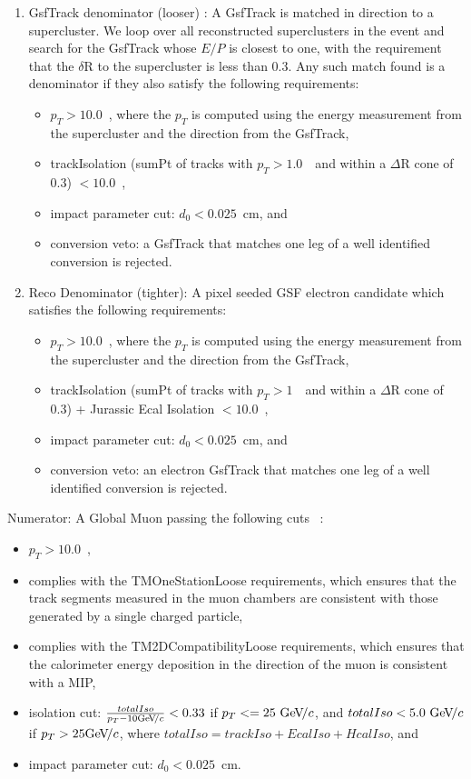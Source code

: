 \documentclass{cmspaper}
\begin{document}
\begin{enumerate}
\item GsfTrack denominator (looser) : A GsfTrack is matched in direction to a supercluster. We loop over all reconstructed superclusters in the event and search for the GsfTrack whose $E/P$ is closest to one, with the requirement that the $\delta$R to the supercluster is less than 0.3. Any such match found is a denominator if they also satisfy the following requirements:
  \begin{itemize}
  \item $p_T > 10.0$~\GeVc , where the $p_T$ is computed using the energy measurement from the supercluster and the direction from the GsfTrack,
  \item trackIsolation (sumPt of tracks with $p_T > 1.0$~\GeVc~and within a $\Delta$R cone of 0.3) $< 10.0$~\GeVc,
  \item impact parameter cut: $d_{0} < 0.025$~cm, and
  \item conversion veto: a GsfTrack that matches one leg of a well identified conversion is rejected.
  \end{itemize}
 
\item Reco Denominator (tighter): A pixel seeded GSF electron candidate which satisfies the following requirements:
  \begin{itemize}
  \item $p_T > 10.0$~\GeVc, where the $p_T$ is computed using the energy measurement from the supercluster and the direction from the GsfTrack,
  \item trackIsolation (sumPt of tracks with $p_T > 1$~\GeVc~and within a $\Delta$R cone of 0.3) + Jurassic Ecal Isolation $< 10.0$~\GeV,
  \item impact parameter cut: $d_{0} < 0.025$~cm, and
  \item conversion veto: an electron GsfTrack that matches one leg of a well identified conversion is rejected.
  \end{itemize}
\end{enumerate}

Numerator: A Global Muon passing the following cuts~ \cite{muonID}:
\begin{itemize}
\item $p_T > 10.0$~\GeVc,
\item complies with the TMOneStationLoose requirements, which ensures that the track segments measured in the muon chambers are consistent with those generated by a single charged particle,
\item complies with the TM2DCompatibilityLoose requirements, which ensures that the calorimeter energy deposition in the direction of the muon is consistent with a MIP,
\item isolation cut: $\frac{totalIso}{p_T - 10\mathrm{Ge\kern -0.1em V}\!/c} < 0.33$ if $p_T <= 25~\mathrm{Ge\kern -0.1em V}\!/c$, and $totalIso < 5.0~\mathrm{Ge\kern -0.1em V}\!/c$ if $p_T > 25\mathrm{Ge\kern -0.1em V}\!/c$, where $totalIso = trackIso + EcalIso + HcalIso$, and
\item impact parameter cut: $d_{0} < 0.025$~cm.
\end{itemize}
\end{document}
